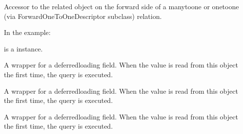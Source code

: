 \documentclass[letterpaper,10pt,spanish]{sphinxmanual}
\begin{document}
\begin{fulllineitems}
\begin{fulllineitems}

\pysigstartsignatures
{}
\pysigstopsignatures
\sphinxAtStartPar
Accessor to the related object on the forward side of a many\sphinxhyphen{}to\sphinxhyphen{}one or
one\sphinxhyphen{}to\sphinxhyphen{}one (via ForwardOneToOneDescriptor subclass) relation.

\sphinxAtStartPar
In the example:

\begin{sphinxVerbatim}[commandchars=\\\{\}]
 
       
\end{sphinxVerbatim}

\sphinxAtStartPar
{} is a  instance.

\end{fulllineitems}



\begin{fulllineitems}

\pysigstartsignatures
{}
\pysigstopsignatures
\end{fulllineitems}



\begin{fulllineitems}

\pysigstartsignatures
{}
\pysigstopsignatures
\sphinxAtStartPar
A wrapper for a deferred\sphinxhyphen{}loading field. When the value is read from this
object the first time, the query is executed.

\end{fulllineitems}



\begin{fulllineitems}

\pysigstartsignatures
{}
\pysigstopsignatures
\sphinxAtStartPar
A wrapper for a deferred\sphinxhyphen{}loading field. When the value is read from this
object the first time, the query is executed.

\end{fulllineitems}



\begin{fulllineitems}

\pysigstartsignatures
{}
\pysigstopsignatures
\sphinxAtStartPar
A wrapper for a deferred\sphinxhyphen{}loading field. When the value is read from this
object the first time, the query is executed.

\end{fulllineitems}


\end{fulllineitems}
\end{document}
